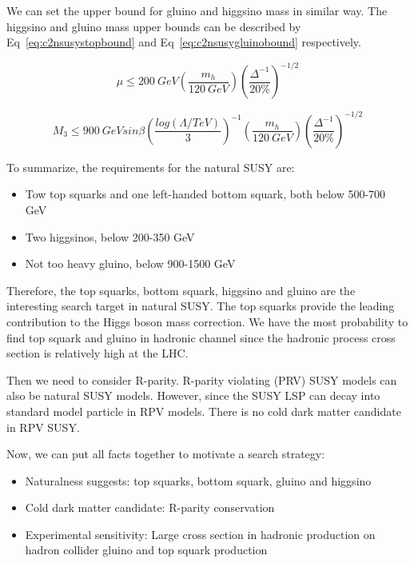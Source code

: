 We can set the upper bound for gluino and higgsino mass in similar way\cite{Papucci:2011wy}. The higgsino and gluino mass upper bounds can be described by Eq~\ref{eq:c2nsusystopbound} and Eq~\ref{eq:c2nsusygluinobound} respectively.

\begin{equation}
 \mu \leq 200~GeV (\frac{m_{h}}{120~GeV})(\frac{\Delta^{-1}}{20\%})^{-1/2}
 \label{eq:c2nsusyhiggsinobound}
\end{equation}

\begin{equation}
 M_{3} \leq 900~GeV sin\beta (\frac{log(\Lambda/TeV)}{3})^{-1}(\frac{m_{h}}{120~GeV})(\frac{\Delta^{-1}}{20\%})^{-1/2}
 \label{eq:c2nsusygluinobound}
\end{equation}

To summarize, the requirements for the natural SUSY are:
\begin{itemize}
\item Tow top squarks and one left-handed bottom squark, both below 500-700 GeV
\item Two higgsinos, below 200-350 GeV
\item Not too heavy gluino, below 900-1500 GeV
\end{itemize}

Therefore, the top squarks, bottom squark, higgsino and gluino are the interesting search target in natural SUSY. The top squarks provide the leading contribution to the Higgs boson mass correction. We have the most probability to find top squark and gluino in hadronic channel since the hadronic process cross section is relatively high at the LHC. 

Then we need to consider R-parity. R-parity violating (PRV) SUSY models can also be natural SUSY models. However, since the SUSY LSP can decay into standard model particle in RPV models. There is no cold dark matter candidate in RPV SUSY. 

Now, we can put all facts together to motivate a search strategy: 
\begin{itemize}
\item Naturalness suggests: top squarks, bottom squark, gluino and higgsino
\item Cold dark matter candidate: R-parity conservation
\item Experimental sensitivity: Large cross section in hadronic production on hadron collider gluino and top squark production
\end{itemize}


